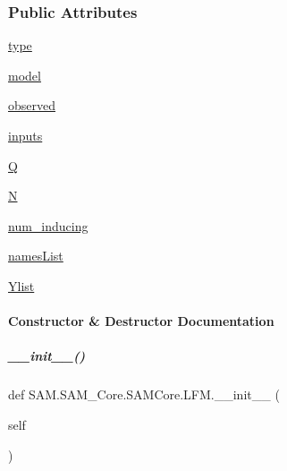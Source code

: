 \subsubsection*{Public Attributes}
\begin{DoxyCompactItemize}
\item 
\hyperlink{group__icubclient__SAM__Core_a91e1c157cd5fdb4d9ded80ea536f7db1}{type}
\item 
\hyperlink{group__icubclient__SAM__Core_a7c151a43617675bbd42c596eda8c7c36}{model}
\item 
\hyperlink{group__icubclient__SAM__Core_ace2526a537a5af0d3609a022f32d380b}{observed}
\item 
\hyperlink{group__icubclient__SAM__Core_a35c00c5bc74b2ff0d93868b9f6d9b888}{inputs}
\item 
\hyperlink{group__icubclient__SAM__Core_adc719c2f2f24d23fb8dc2368c711d6b2}{Q}
\item 
\hyperlink{group__icubclient__SAM__Core_af1dab4180e10fe444420a60a7eed48ba}{N}
\item 
\hyperlink{group__icubclient__SAM__Core_addd9a08eac90755cd3d4d3cf173ebcdf}{num\+\_\+inducing}
\item 
\hyperlink{group__icubclient__SAM__Core_a2344a60b868b875934f74c352072f502}{names\+List}
\item 
\hyperlink{group__icubclient__SAM__Core_af743fbe6f09bdf3ef27cf270330b8364}{Ylist}
\end{DoxyCompactItemize}


\paragraph{Constructor \& Destructor Documentation}
\mbox{\label{group__icubclient__SAM__Core_ac5a497600911dabbeec52f47198662ce}} 
\subparagraph{\texorpdfstring{\+\_\+\+\_\+init\+\_\+\+\_\+()}{\_\_init\_\_()}}
{\footnotesize\ttfamily def S\+A\+M.\+S\+A\+M\+\_\+\+Core.\+S\+A\+M\+Core.\+L\+F\+M.\+\_\+\+\_\+init\+\_\+\+\_\+ (\begin{DoxyParamCaption}\item[{}]{self }\end{DoxyParamCaption})}



